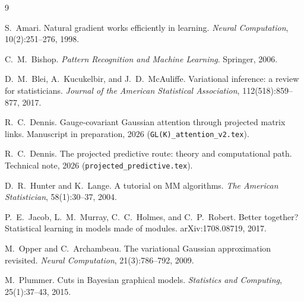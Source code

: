 \documentclass[11pt]{article}
\theoremstyle{definition}
\theoremstyle{remark}
\begin{document}
\begin{thebibliography}{9}

S.~Amari.
\newblock Natural gradient works efficiently in learning.
\newblock \emph{Neural Computation}, 10(2):251--276, 1998.

C.~M.~Bishop.
\newblock \emph{Pattern Recognition and Machine Learning}.
\newblock Springer, 2006.

D.~M.~Blei, A.~Kucukelbir, and J.~D.~McAuliffe.
\newblock Variational inference: a review for statisticians.
\newblock \emph{Journal of the American Statistical Association}, 112(518):859--877, 2017.

R.~C.~Dennis.
\newblock Gauge-covariant Gaussian attention through projected matrix links.
\newblock Manuscript in preparation, 2026 (\texttt{GL(K)\_attention\_v2.tex}).

R.~C.~Dennis.
\newblock The projected predictive route: theory and computational path.
\newblock Technical note, 2026 (\texttt{projected\_predictive.tex}).

D.~R.~Hunter and K.~Lange.
\newblock A tutorial on {MM} algorithms.
\newblock \emph{The American Statistician}, 58(1):30--37, 2004.

P.~E.~Jacob, L.~M.~Murray, C.~C.~Holmes, and C.~P.~Robert.
\newblock Better together? {S}tatistical learning in models made of modules.
\newblock arXiv:1708.08719, 2017.

M.~Opper and C.~Archambeau.
\newblock The variational {G}aussian approximation revisited.
\newblock \emph{Neural Computation}, 21(3):786--792, 2009.

M.~Plummer.
\newblock Cuts in {B}ayesian graphical models.
\newblock \emph{Statistics and Computing}, 25(1):37--43, 2015.

\end{thebibliography}
\end{document}
